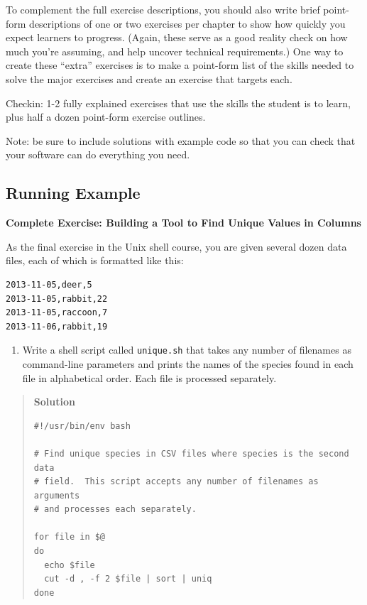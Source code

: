 \documentclass[10pt,statementpaper]{memoir}
\providecommand{\tightlist}{%
  \setlength{\itemsep}{0pt}\setlength{\parskip}{0pt}}
\begin{document}
To complement the full exercise descriptions, you should also write
brief point-form descriptions of one or two exercises per chapter to
show how quickly you expect learners to progress. (Again, these serve as
a good reality check on how much you're assuming, and help uncover
technical requirements.) One way to create these ``extra'' exercises is
to make a point-form list of the skills needed to solve the major
exercises and create an exercise that targets each.

Checkin: 1-2 fully explained exercises that use the skills the student
is to learn, plus half a dozen point-form exercise outlines.

Note: be sure to include solutions with example code so that you can
check that your software can do everything you need.

\subsection*{Running Example}\label{running-example-2}

\textbf{Complete Exercise: Building a Tool to Find Unique Values in
Columns}

As the final exercise in the Unix shell course, you are given several
dozen data files, each of which is formatted like this:

\begin{verbatim}
2013-11-05,deer,5
2013-11-05,rabbit,22
2013-11-05,raccoon,7
2013-11-06,rabbit,19
\end{verbatim}

\begin{enumerate}
\def\labelenumi{\arabic{enumi}.}
\tightlist
\item
  Write a shell script called \texttt{unique.sh} that takes any number
  of filenames as command-line parameters and prints the names of the
  species found in each file in alphabetical order. Each file is
  processed separately.
\end{enumerate}

\begin{quote}
\textbf{Solution}

\begin{verbatim}
#!/usr/bin/env bash

# Find unique species in CSV files where species is the second data
# field.  This script accepts any number of filenames as arguments
# and processes each separately.

for file in $@
do
  echo $file
  cut -d , -f 2 $file | sort | uniq
done
\end{verbatim}
\end{quote}
\end{document}
